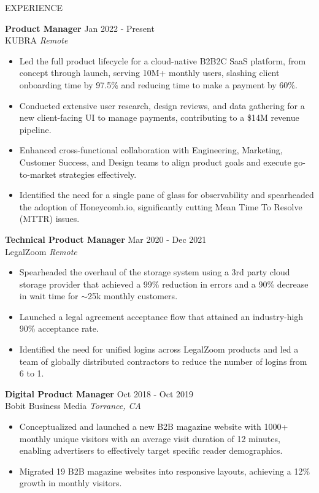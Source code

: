 \documentclass{resume} %
\begin{document}
\begin{rSection}{EXPERIENCE}

\textbf{Product Manager} \hfill Jan 2022 - Present\\
KUBRA \hfill \textit{Remote}
 \begin{itemize}
    \itemsep -3pt {} 
     \item Led the full product lifecycle for a cloud-native B2B2C SaaS platform, from concept through launch, serving 10M+ monthly users, slashing client onboarding time by 97.5\% and reducing time to make a payment by 60\%.
     \item Conducted extensive user research, design reviews, and data gathering for a new client-facing UI to manage payments, contributing to a \$14M revenue pipeline.
     \item Enhanced cross-functional collaboration with Engineering, Marketing, Customer Success, and Design teams to align product goals and execute go-to-market strategies effectively.
     \item Identified the need for a single pane of glass for observability and spearheaded the adoption of Honeycomb.io, significantly cutting Mean Time To Resolve (MTTR) issues.
 \end{itemize}
 
\textbf{Technical Product Manager} \hfill Mar 2020 - Dec 2021\\
LegalZoom \hfill \textit{Remote}
 \begin{itemize}
    \itemsep -3pt {} 
     \item Spearheaded the overhaul of the storage system using a 3rd party cloud storage provider that achieved a 99\% reduction in errors and a 90\% decrease in wait time for \(\sim \)25k monthly customers.
     \item Launched a legal agreement acceptance flow that attained an industry-high 90\% acceptance rate.
     \item Identified the need for unified logins across LegalZoom products and led a team of globally distributed contractors to reduce the number of logins from 6 to 1.
 \end{itemize}

\textbf{Digital Product Manager} \hfill Oct 2018 - Oct 2019\\
Bobit Business Media \hfill \textit{Torrance, CA}
 \begin{itemize}
    \itemsep -3pt {} 
     \item Conceptualized and launched a new B2B magazine website with 1000+ monthly unique visitors with an average visit duration of 12 minutes, enabling advertisers to effectively target specific reader demographics.
     \item Migrated 19 B2B magazine websites into responsive layouts, achieving a 12\% growth in monthly visitors.
 \end{itemize}


\end{rSection}
\end{document}
